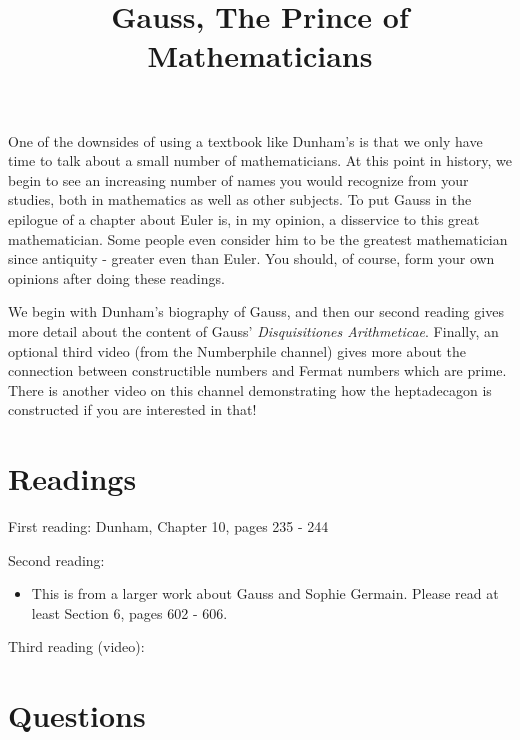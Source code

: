 \documentclass[nooutcomes]{ximera}
\title{Gauss, The Prince of Mathematicians}
\begin{document}
\begin{abstract}
    
\end{abstract}
\maketitle



One of the downsides of using a textbook like Dunham's is that we only have time to talk about a small number of mathematicians.  At this point in history, we begin to see an increasing number of names you would recognize from your studies, both in mathematics as well as other subjects.  To put Gauss in the epilogue of a chapter about Euler is, in my opinion, a disservice to this great mathematician.  Some people even consider him to be the greatest mathematician since antiquity - greater even than Euler.  You should, of course, form your own opinions after doing these readings.

We begin with Dunham's biography of Gauss, and then our second reading gives more detail about the content of Gauss' {\em Disquisitiones Arithmeticae}.   Finally, an optional third video (from the Numberphile channel) gives more about the connection between constructible numbers and Fermat numbers which are prime. There is another video on this channel demonstrating how the heptadecagon is constructed if you are interested in that!


\section{Readings}
First reading: Dunham, Chapter 10, pages 235 - 244

Second reading: 
\begin{itemize}
 \item This is from a larger work about Gauss and Sophie Germain. Please read at least Section 6, pages 602 - 606.
\end{itemize}

Third reading (video): 



\section{Questions}
\end{document}

